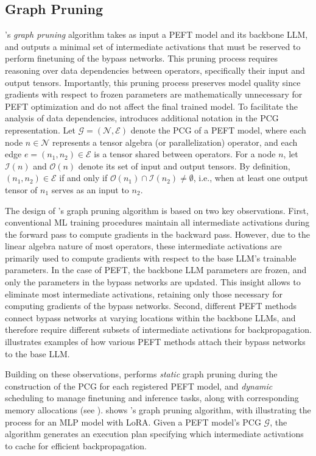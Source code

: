 \subsection{Graph Pruning}
\label{flexllm:subsec:pruning}

\FlexLLM's {\em graph pruning} algorithm takes as input a PEFT model and its backbone LLM, and outputs a minimal set of intermediate activations that must be reserved to perform finetuning of the bypass networks.
%
This pruning process requires reasoning over data dependencies between operators, specifically their input and output tensors. Importantly, this pruning process preserves model quality since gradients with respect to frozen parameters are mathematically unnecessary for PEFT optimization and do not affect the final trained model. To facilitate the analysis of data dependencies, \FlexLLM introduces additional notation in the PCG representation.
Let $\mathcal{G}=(\mathcal{N}, \mathcal{E})$ denote the PCG of a PEFT model, where each node $n \in \mathcal{N}$ represents a tensor algebra (or parallelization) operator, and each edge $e=(n_1, n_2) \in \mathcal{E}$ is a tensor shared between operators. For a node $n$, let $\mathcal{I}(n)$ and $\mathcal{O}(n)$ denote its set of input and output tensors.
%
By definition, $(n_1, n_2) \in \mathcal{E}$ if and only if $\mathcal{O}(n_1) \cap \mathcal{I}(n_2) \neq \emptyset$, i.e., when at least one output tensor of $n_1$ serves as an input to $n_2$.

The design of \FlexLLM's graph pruning algorithm is based on two key observations.
%
First, conventional ML training procedures maintain all intermediate activations during the forward pass to compute gradients in the backward pass.
%
However, due to the linear algebra nature of most operators, these intermediate activations are primarily used to compute gradients with respect to the base LLM's trainable parameters. In the case of PEFT, the backbone LLM parameters are frozen, and only the parameters in the bypass networks are updated.
%
This insight allows \FlexLLM to eliminate most intermediate activations, retaining only those necessary for computing gradients of the bypass networks.
Second, different PEFT methods connect bypass networks at varying locations within the backbone LLMs, and therefore require different subsets of intermediate activations for backpropagation.
 illustrates examples of how various PEFT methods attach their bypass networks to the base LLM.

Building on these observations, \FlexLLM performs {\em static} graph pruning during the construction of the PCG for each registered PEFT model, and {\em dynamic} scheduling to manage finetuning and inference tasks, along with corresponding memory allocations (see ).
%
 shows \FlexLLM's graph pruning algorithm, with  illustrating the process for an MLP model with LoRA. Given a PEFT model's PCG $\mathcal{G}$, the algorithm generates an execution plan specifying which intermediate activations to cache for efficient backpropagation.

